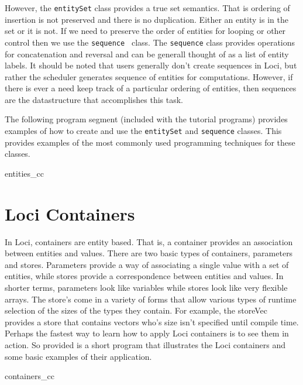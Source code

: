 \documentclass[10pt,epsf]{book}
\begin{document}
However, the {\tt entitySet} class provides a true set semantics.
That is ordering of insertion is not preserved and there is no
duplication.  Either an entity is in the set or it is not.  If we need
to preserve the order of entities for looping or other control then we
use the {\tt sequence } class.  The {\tt sequence} class provides
operations for concatenation and reversal and can be generall thought
of as a list of entity labels.  It should be noted that users
generally don't create sequences in Loci, but rather the scheduler
generates sequence of entities for computations.  However, if there is
ever a need keep track of a particular ordering of entities, then
sequences are the datastructure that accomplishes this task.

The following program segment (included with the tutorial programs)
provides examples of how to create and use the {\tt  entitySet} and
{\tt sequence} classes.  This provides examples of the most commonly
used programming techniques for these classes.

 {entities_cc}

\section {Loci Containers}

In Loci, containers are entity based.  That is, a container provides
an association between entities and values.  There are two basic types
of containers, parameters and stores.  Parameters provide a way of
associating a single value with a set of entities, while stores
provide a correspondence between entities and values.  In shorter
terms, parameters look like variables while stores look like very
flexible arrays.  The store's come in a variety of forms that allow
various types of runtime selection of the sizes of the types they
contain.  For example, the storeVec provides a store that contains
vectors who's size isn't specified until compile time.  Perhaps the
fastest way to learn how to apply Loci containers is to see them in
action.  So provided is a short program that illustrates the Loci
containers and some basic examples of their application.

 {containers_cc}
\end{document}
